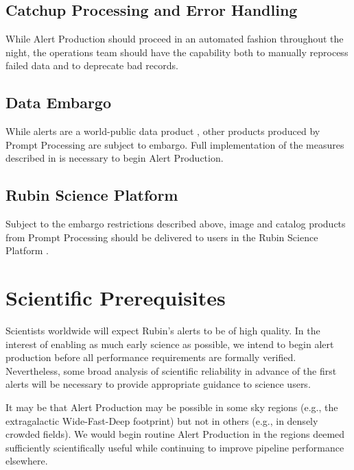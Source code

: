 \documentclass[OPS,authoryear,toc]{lsstdoc}
\begin{document}
\subsection{Catchup Processing and Error Handling}

While Alert Production should proceed in an automated fashion throughout the night, the operations team should have the capability both to manually reprocess failed data and to deprecate bad records.


\subsection{Data Embargo}

While alerts are a world-public data product , other products produced by Prompt Processing are subject to embargo.
Full implementation of the measures described in  is necessary to begin Alert Production.

\subsection{Rubin Science Platform}
Subject to the embargo restrictions described above, image and catalog products from Prompt Processing should be delivered to users in the Rubin Science Platform .



\section{Scientific Prerequisites}

Scientists worldwide will expect Rubin's alerts to be of high quality.
In the interest of enabling as much early science as possible, we intend to begin alert production before all performance requirements are formally verified.  
Nevertheless, some broad analysis of scientific reliability in advance of the first alerts will be necessary to provide appropriate guidance to science users.


It may be that Alert Production may be possible in some sky regions (e.g., the extragalactic Wide-Fast-Deep footprint) but not in others (e.g., in densely crowded fields).
We would begin routine Alert Production in the regions deemed sufficiently scientifically useful while continuing to improve pipeline performance elsewhere.
\end{document}
